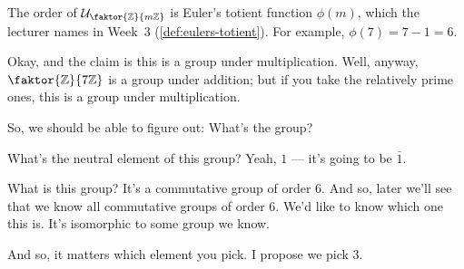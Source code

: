 \begin{content}
\end{content}

\begin{aiNote}
The order of $\mathcal{U}_{\faktor{\mathbb{Z}}{m\mathbb{Z}}}$ is Euler's totient function $\phi(m)$, which the lecturer names in Week~3 (\cref{def:eulers-totient}). For example, $\phi(7) = 7 - 1 = 6$.
\end{aiNote}

\begin{speech}[00:36:50 - 00:37:28]
Okay, and the claim is this is a group under multiplication. Well, anyway, $\faktor{\mathbb{Z}}{7\mathbb{Z}}$ is a group under addition; but if you take the relatively prime ones, this is a group under multiplication.

So, we should be able to figure out: What's the group?

What's the neutral element of this group? Yeah, $1$ --- it's going to be $\bar{1}$.

What is this group? It's a commutative group of order $6$. And so, later we'll see that we know all commutative groups of order $6$. We'd like to know which one this is. It's isomorphic to some group we know.

And so, it matters which element you pick. I propose we pick $3$.
\end{speech}

